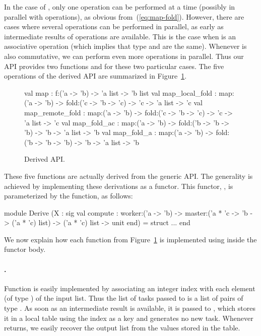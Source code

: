 \documentclass[a4paper,12pt]{article}
\begin{document}
In the case of , only one  operation can
be performed at a time (possibly in parallel with 
operations), as obvious from~(\ref{eq:map-fold}). However, there are
cases where several  operations can be performed in parallel,
as early as intermediate results of  operations are available.
This is the case when  is an associative operation (which
implies that type  and  are the same).
Whenever
 is also commutative, we can perform even more 
operations in parallel. Thus our API provides two functions
 and  for these two particular cases.
The five operations of the derived API are summarized
in Figure~\ref{fig:derived}.
\begin{figure}[t]
  \begin{ocaml}
    val map : 
      f:('a -> 'b) -> 'a list -> 'b list 
    val map_local_fold : 
      map:('a -> 'b) -> fold:('c -> 'b -> 'c) -> 
      'c -> 'a list -> 'c 
    val map_remote_fold : 
      map:('a -> 'b) -> fold:('c -> 'b -> 'c) -> 
      'c -> 'a list -> 'c 
    val map_fold_ac : 
      map:('a -> 'b) -> fold:('b -> 'b -> 'b) -> 
      'b -> 'a list -> 'b 
    val map_fold_a : 
      map:('a -> 'b) -> fold:('b -> 'b -> 'b) -> 
      'b -> 'a list -> 'b
  \end{ocaml}
  \caption{Derived API.}
\label{fig:derived}
\end{figure}

These five functions are actually derived from the generic API.  The
generality is achieved by implementing these derivations as a functor.
This functor, , is parameterized by the 
function, as follows:
\begin{ocaml}
module Derive
  (X : sig
     val compute : 
       worker:('a -> 'b) -> 
       master:('a * 'c -> 'b -> ('a * 'c) list) ->
       ('a * 'c) list -> unit
   end) = struct ... end
\end{ocaml}
We now explain how each function from Figure~\ref{fig:derived} is
implemented using  inside the functor body.

\paragraph{.} 
Function  is easily implemented by associating an integer
index with each element (of type ) of the input list. Thus the
list of tasks passed to  is a list of pairs of type .
As soon as an intermediate result is available, it is passed to
, which stores it in a local table using the index as a key
and generates no new task. Whenever  returns, we easily
recover the output list from the values stored in the table.
\end{document}
